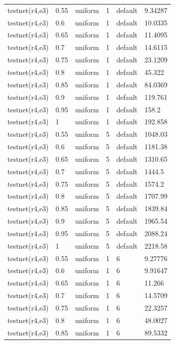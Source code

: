 \begin{longtable}[H]{llllll}
testnet(r4,e3) & 0.55 & uniform & 1 & default & 9.34287 \\
testnet(r4,e3) & 0.6  & uniform & 1 & default & 10.0335 \\
testnet(r4,e3) & 0.65 & uniform & 1 & default & 11.4095 \\
testnet(r4,e3) & 0.7  & uniform & 1 & default & 14.6115 \\
testnet(r4,e3) & 0.75 & uniform & 1 & default & 23.1209 \\
testnet(r4,e3) & 0.8  & uniform & 1 & default & 45.322  \\
testnet(r4,e3) & 0.85 & uniform & 1 & default & 84.0369 \\
testnet(r4,e3) & 0.9  & uniform & 1 & default & 119.761 \\
testnet(r4,e3) & 0.95 & uniform & 1 & default & 158.2   \\
testnet(r4,e3) & 1    & uniform & 1 & default & 192.858 \\
testnet(r4,e3) & 0.55 & uniform & 5 & default & 1048.03 \\
testnet(r4,e3) & 0.6  & uniform & 5 & default & 1181.38 \\
testnet(r4,e3) & 0.65 & uniform & 5 & default & 1310.65 \\
testnet(r4,e3) & 0.7  & uniform & 5 & default & 1444.5  \\
testnet(r4,e3) & 0.75 & uniform & 5 & default & 1574.2  \\
testnet(r4,e3) & 0.8  & uniform & 5 & default & 1707.99 \\
testnet(r4,e3) & 0.85 & uniform & 5 & default & 1839.84 \\
testnet(r4,e3) & 0.9  & uniform & 5 & default & 1965.54 \\
testnet(r4,e3) & 0.95 & uniform & 5 & default & 2088.24 \\
testnet(r4,e3) & 1    & uniform & 5 & default & 2218.58 \\
testnet(r4,e3) & 0.55 & uniform & 1 & 6       & 9.27776 \\
testnet(r4,e3) & 0.6  & uniform & 1 & 6       & 9.91647 \\
testnet(r4,e3) & 0.65 & uniform & 1 & 6       & 11.266  \\
testnet(r4,e3) & 0.7  & uniform & 1 & 6       & 14.5709 \\
testnet(r4,e3) & 0.75 & uniform & 1 & 6       & 22.3257 \\
testnet(r4,e3) & 0.8  & uniform & 1 & 6       & 48.0027 \\
testnet(r4,e3) & 0.85 & uniform & 1 & 6       & 89.5332 \\

\end{longtable}
